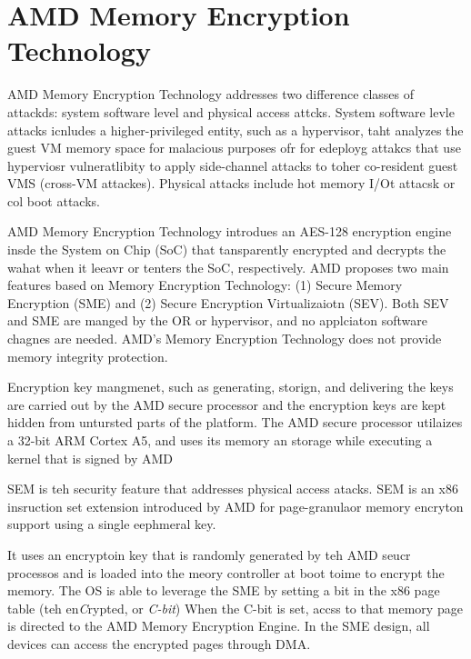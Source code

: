 \section{AMD Memory Encryption Technology}

%
%


AMD Memory Encryption Technology addresses two difference classes of attackds:
system software level and physical access attcks.  
%
System software levle attacks  icnludes a higher-privileged entity, such as a
hypervisor, taht analyzes the guest VM memory space for malacious purposes ofr
for edeployg attakcs that use hyperviosr vulneratlibity to apply side-channel
attacks to toher co-resident guest VMS (cross-VM attackes).
%
Physical attacks include hot memory I/Ot attacsk or col boot attacks.


AMD Memory Encryption Technology introdues an AES-128 encryption engine insde
the System on Chip (SoC) that tansparently encrypted and decrypts the wahat
when it leeavr or tenters the SoC, respectively.
%
AMD proposes two main features based on Memory Encryption Technology: (1)
Secure Memory Encryption (SME) and (2) Secure Encryption Virtualizaiotn (SEV).
%
Both SEV and SME are manged by the OR or hypervisor, and no applciaton software
chagnes are needed.
%
AMD's Memory Encryption Technology does not provide memory integrity
protection.


Encryption key mangmenet, such as generating, storign, and delivering the keys
are carried out by the AMD secure processor and the encryption keys are kept
hidden from untursted parts of the platform.
%
The AMD secure processor utilaizes a 32-bit ARM Cortex A5, and uses its memory
an storage while executing a kernel that is signed by AMD


SEM is teh security feature that addresses physical access atacks.
%
SEM is an x86 insruction set extension introduced by AMD for page-granulaor
memory encryton support using a single eephmeral key.

It uses an encryptoin key that is randomly generated by teh AMD seucr processos
and is loaded into the meory controller at boot toime to encrypt the memory.
%
The OS is able to leverage the SME by setting a bit in the x86 page table (teh
en\emph{C}rypted, or \emph{C-bit})
%
When the C-bit is set, accss to that memory page is directed to the AMD Memory
Encryption Engine.
%
In the SME design, all devices can access the encrypted pages through DMA.



